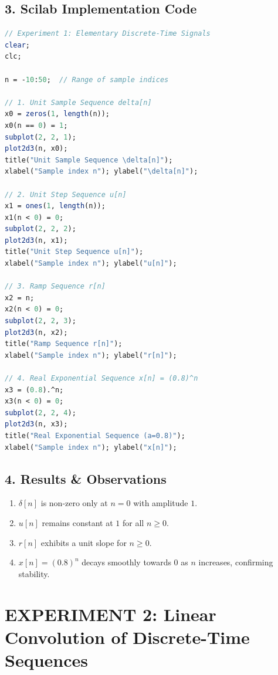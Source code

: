 \documentclass[11pt,a4paper]{article}
\begin{document}
\subsection*{3. Scilab Implementation Code}
\begin{lstlisting}[language=Scilab]
// Experiment 1: Elementary Discrete-Time Signals
clear;
clc;

n = -10:50;  // Range of sample indices

// 1. Unit Sample Sequence delta[n]
x0 = zeros(1, length(n));
x0(n == 0) = 1;
subplot(2, 2, 1);
plot2d3(n, x0);
title("Unit Sample Sequence \delta[n]");
xlabel("Sample index n"); ylabel("\delta[n]");

// 2. Unit Step Sequence u[n]
x1 = ones(1, length(n));
x1(n < 0) = 0;
subplot(2, 2, 2);
plot2d3(n, x1);
title("Unit Step Sequence u[n]");
xlabel("Sample index n"); ylabel("u[n]");

// 3. Ramp Sequence r[n]
x2 = n;
x2(n < 0) = 0;
subplot(2, 2, 3);
plot2d3(n, x2);
title("Ramp Sequence r[n]");
xlabel("Sample index n"); ylabel("r[n]");

// 4. Real Exponential Sequence x[n] = (0.8)^n
x3 = (0.8).^n;
x3(n < 0) = 0;
subplot(2, 2, 4);
plot2d3(n, x3);
title("Real Exponential Sequence (a=0.8)");
xlabel("Sample index n"); ylabel("x[n]");
\end{lstlisting}

\subsection*{4. Results \& Observations}
\begin{enumerate}
    \item $\delta[n]$ is non-zero only at $n=0$ with amplitude $1$.
    \item $u[n]$ remains constant at $1$ for all $n \ge 0$.
    \item $r[n]$ exhibits a unit slope for $n \ge 0$.
    \item $x[n] = (0.8)^n$ decays smoothly towards $0$ as $n$ increases, confirming stability.
\end{enumerate}

\newpage

\section*{\textcolor{headcolor}{EXPERIMENT 2: Linear Convolution of Discrete-Time Sequences}}
\end{document}
